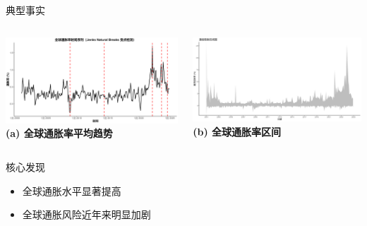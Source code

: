 \documentclass{beamer}
\begin{document}
\begin{frame}{典型事实}
  \centering
  \begin{columns}
    \centering
    \includegraphics[width=\linewidth]{fig/Inflation_Jenks.png}
    \textbf{(a) 全球通胀率平均趋势}
    
    \centering
    \includegraphics[width=\linewidth]{fig/Inflation_TimeSeries.png}
    \textbf{(b) 全球通胀率区间}
  \end{columns}

  \vspace{0.5cm} %
  \begin{block}{核心发现}
  \begin{itemize}
    \item 全球通胀水平显著提高
    \item 全球通胀风险近年来明显加剧
  \end{itemize}
\end{block}
\end{frame}
\end{document}
